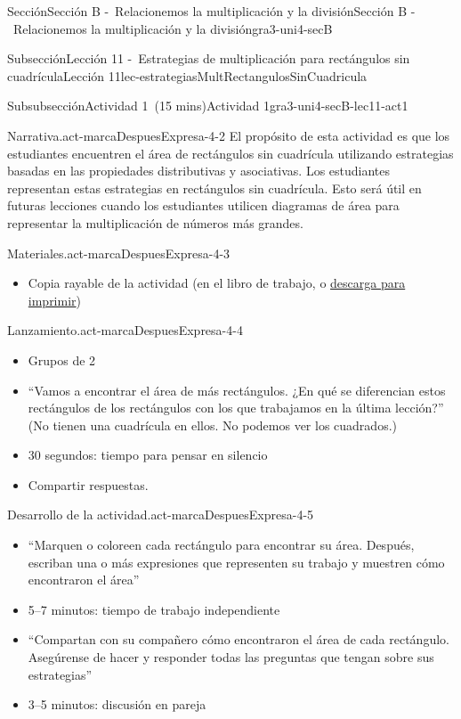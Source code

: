 \documentclass[oneside,10pt,]{article}
\begin{document}
\begin{sectionptx}{Sección}{Sección B -~Relacionemos la multiplicación y la división}{}{Sección B -~Relacionemos la multiplicación y la división}{}{}{gra3-uni4-secB}
\begin{subsectionptx}{Subsección}{Lección 11 -~Estrategias de multiplicación para rectángulos sin cuadrícula}{}{Lección 11}{}{}{lec-estrategiasMultRectangulosSinCuadricula}
\begin{subsubsectionptx}{Subsubsección}{Actividad 1~(15 mins)}{}{Actividad 1}{}{}{gra3-uni4-secB-lec11-act1}
\begin{paragraphs}{Narrativa.}{act-marcaDespuesExpresa-4-2}
El propósito de esta actividad es que los estudiantes encuentren el área de rectángulos sin cuadrícula utilizando estrategias basadas en las propiedades distributivas y asociativas. Los estudiantes representan estas estrategias en rectángulos sin cuadrícula. Esto será útil en futuras lecciones cuando los estudiantes utilicen diagramas de área para representar la multiplicación de números más grandes.%
\end{paragraphs}%
\begin{paragraphs}{Materiales.}{act-marcaDespuesExpresa-4-3}%
%
\begin{itemize}[label=\textbullet]
\item{}Copia rayable de la actividad (en el libro de trabajo, o \href{external/act-pdf/act-marcaDespuesExpresa.pdf}{descarga para imprimir}\footnotemark{})%
\end{itemize}
\end{paragraphs}%
\begin{paragraphs}{Lanzamiento.}{act-marcaDespuesExpresa-4-4}%
%
\begin{itemize}[label=\textbullet]
\item{}Grupos de 2%
\item{}``Vamos a encontrar el área de más rectángulos. ¿En qué se diferencian estos rectángulos de los rectángulos con los que trabajamos en la última lección?'' (No tienen una cuadrícula en ellos. No podemos ver los cuadrados.)%
\item{}30 segundos: tiempo para pensar en silencio%
\item{}Compartir respuestas.%
\end{itemize}
\end{paragraphs}%
\begin{paragraphs}{Desarrollo de la actividad.}{act-marcaDespuesExpresa-4-5}%
%
\begin{itemize}[label=\textbullet]
\item{}``Marquen o coloreen cada rectángulo para encontrar su área. Después, escriban una o más expresiones que representen su trabajo y muestren cómo encontraron el área''%
\item{}5–7 minutos: tiempo de trabajo independiente%
\item{}``Compartan con su compañero cómo encontraron el área de cada rectángulo. Asegúrense de hacer y responder todas las preguntas que tengan sobre sus estrategias''%
\item{}3–5 minutos: discusión en pareja%
\end{itemize}
\end{paragraphs}%

\end{subsubsectionptx}
\end{subsectionptx}
\end{sectionptx}
\end{document}
